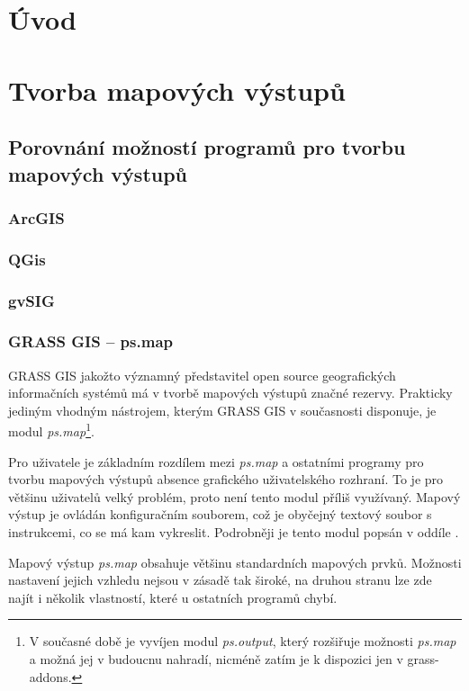 \documentclass[a4paper,12pt,draft]{article}
\author{Anna Kratochvílová}
\newcommand{\modul}[1]{\emph{#1}}
\begin{document}
\tableofcontents
\section{Úvod}

\section{Tvorba mapových výstupů}

\subsection{Porovnání možností programů pro tvorbu mapových výstupů}

\subsubsection{ArcGIS}

\subsubsection{QGis}

\subsubsection{gvSIG}

\subsubsection{GRASS GIS -- ps.map}
\label{sec:porovnani:psmap}
GRASS GIS jakožto významný představitel open source geografických informačních systémů má v tvorbě mapových výstupů značné rezervy. Prakticky jediným vhodným nástrojem, kterým GRASS GIS v současnosti disponuje, je modul \modul{ps.map}\footnote{V současné době je vyvíjen modul \modul{ps.output}, který rozšiřuje možnosti \modul{ps.map} a možná jej v budoucnu nahradí, nicméně zatím je k dispozici jen v grass-addons.}.

Pro uživatele je základním rozdílem mezi \modul{ps.map} a ostatními programy pro tvorbu mapových výstupů  absence grafického uživatelského rozhraní. To je pro většinu uživatelů velký problém, proto není tento modul příliš využívaný. Mapový výstup je ovládán konfiguračním souborem, což je obyčejný textový soubor s instrukcemi, co se má kam vykreslit. Podrobněji je tento modul popsán v oddíle .

Mapový výstup \modul{ps.map} obsahuje většinu standardních mapových prvků. Možnosti nastavení jejich vzhledu nejsou v zásadě tak široké, na druhou stranu lze zde najít i několik vlastností, které u ostatních programů chybí.
\end{document}

